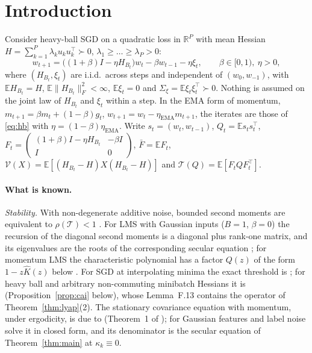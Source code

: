 \documentclass[11pt]{article}
\theoremstyle{remark}
\newcommand{\E}{\mathbb{E}}
\newcommand{\R}{\mathbb{R}}
\newcommand{\T}{\mathcal T}
\newcommand{\V}{\mathcal V}
\begin{document}
\section{Introduction}

Consider heavy-ball SGD on a quadratic loss in $\R^P$ with mean Hessian $H=\sum_{k=1}^P\lambda_ku_ku_k^\top\succ0$, $\lambda_1\ge\dots\ge\lambda_P>0$:
\begin{equation}\label{eq:hb}
w_{t+1}=\big((1+\beta)I-\eta H_{B_t}\big)w_t-\beta w_{t-1}-\eta\xi_t,\qquad\beta\in[0,1),\ \eta>0,
\end{equation}
where $(H_{B_t},\xi_t)$ are i.i.d.\ across steps and independent of $(w_0,w_{-1})$, with $\E H_{B_t}=H$, $\E\|H_{B_t}\|_F^2<\infty$, $\E\xi_t=0$ and $\Sigma_\xi=\E\xi_t\xi_t^\top\succ0$. Nothing is assumed on the joint law of $H_{B_t}$ and $\xi_t$ within a step. In the EMA form of momentum, $m_{t+1}=\beta m_t+(1-\beta)g_t$, $w_{t+1}=w_t-\eta_{\mathrm{EMA}}m_{t+1}$, the iterates are those of \eqref{eq:hb} with $\eta=(1-\beta)\eta_{\mathrm{EMA}}$. Write $s_t=(w_t,w_{t-1})$, $Q_t=\E s_ts_t^\top$, $F_t=\begin{pmatrix}(1+\beta)I-\eta H_{B_t}&-\beta I\\ I&0\end{pmatrix}$, $\bar F=\E F_t$, $\V(X)=\E[(H_{B_t}-H)X(H_{B_t}-H)]$ and $\T(Q)=\E[F_tQF_t^\top]$.

\paragraph{What is known.}
\emph{Stability.} With non-degenerate additive noise, bounded second moments are equivalent to $\rho(\T)<1$ \citep[Ch.~3]{costa2005mjls}. For LMS with Gaussian inputs ($B=1$, $\beta=0$) the recursion of the diagonal second moments is a diagonal plus rank-one matrix, and its eigenvalues are the roots of the corresponding secular equation \citep[eqs.~(20) and (23)]{feuer1985convergence}; for momentum LMS the characteristic polynomial has a factor $Q(z)$ of the form $1-z\widehat K(z)$ below \citep[Section~IV]{roy1990momentum}. For SGD at interpolating minima the exact threshold is \citet[Theorem~5]{mulayoff2024exact}; for heavy ball and arbitrary non-commuting minibatch Hessians it is \citet[Theorem~F.1]{cai2026llm} (Proposition~\ref{prop:cai} below), whose Lemma~F.13 contains the operator of Theorem~\ref{thm:lyap}(2). The stationary covariance equation with momentum, under ergodicity, is due to \citet{liu2021noise} (Theorem~1 of \citet{ziyin2022strength}); for Gaussian features and label noise \citet[Theorem~2]{ziyin2022strength} solve it in closed form, and its denominator is the secular equation of Theorem~\ref{thm:main} at $\kappa_k\equiv0$.
\end{document}
